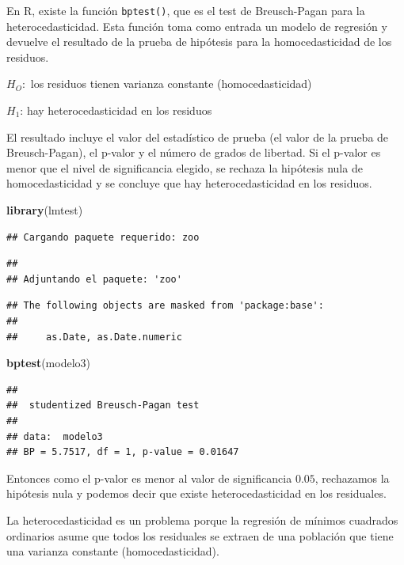 \documentclass[
]{book}
\newenvironment{Shaded}{\begin{snugshade}}{\end{snugshade}}
\newcommand{\FunctionTok}[1]{\textcolor[rgb]{0.13,0.29,0.53}{\textbf{#1}}}
\newcommand{\NormalTok}[1]{#1}
\begin{document}
En R, existe la función \texttt{bptest()}, que es el test de Breusch-Pagan para la heterocedasticidad. Esta función toma como entrada un modelo de regresión y devuelve el resultado de la prueba de hipótesis para la homocedasticidad de los residuos.

\(H_O:\) los residuos tienen varianza constante (homocedasticidad)

\(H_1\): hay heterocedasticidad en los residuos

El resultado incluye el valor del estadístico de prueba (el valor de la prueba de Breusch-Pagan), el p-valor y el número de grados de libertad. Si el p-valor es menor que el nivel de significancia elegido, se rechaza la hipótesis nula de homocedasticidad y se concluye que hay heterocedasticidad en los residuos.

\begin{Shaded}
\begin{Highlighting}[]
\FunctionTok{library}\NormalTok{(lmtest)}
\end{Highlighting}
\end{Shaded}

\begin{verbatim}
## Cargando paquete requerido: zoo
\end{verbatim}

\begin{verbatim}
## 
## Adjuntando el paquete: 'zoo'
\end{verbatim}

\begin{verbatim}
## The following objects are masked from 'package:base':
## 
##     as.Date, as.Date.numeric
\end{verbatim}

\begin{Shaded}
\begin{Highlighting}[]
\FunctionTok{bptest}\NormalTok{(modelo3)}
\end{Highlighting}
\end{Shaded}

\begin{verbatim}
## 
##  studentized Breusch-Pagan test
## 
## data:  modelo3
## BP = 5.7517, df = 1, p-value = 0.01647
\end{verbatim}

Entonces como el p-valor es menor al valor de significancia \(0.05\), rechazamos la hipótesis nula y podemos decir que existe heterocedasticidad en los residuales.

La heterocedasticidad es un problema porque la regresión de mínimos cuadrados ordinarios asume que todos los residuales se extraen de una población que tiene una varianza constante (homocedasticidad).
\end{document}
